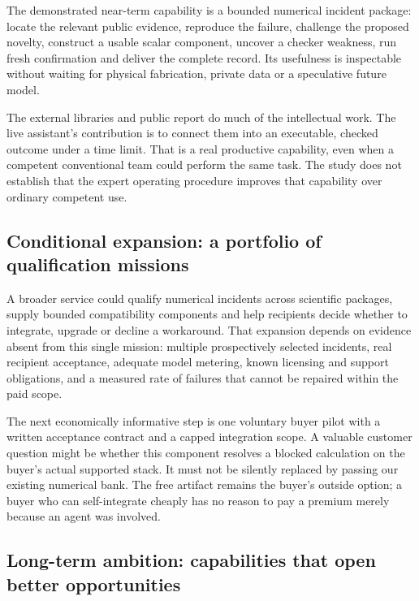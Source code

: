 \documentclass[
  10pt,
]{article}
\begin{document}
The demonstrated near-term capability is a bounded numerical incident
package: locate the relevant public evidence, reproduce the failure,
challenge the proposed novelty, construct a usable scalar component,
uncover a checker weakness, run fresh confirmation and deliver the
complete record. Its usefulness is inspectable without waiting for
physical fabrication, private data or a speculative future model.

The external libraries and public report do much of the intellectual
work. The live assistant's contribution is to connect them into an
executable, checked outcome under a time limit. That is a real
productive capability, even when a competent conventional team could
perform the same task. The study does not establish that the expert
operating procedure improves that capability over ordinary competent
use.

\hypertarget{conditional-expansion-a-portfolio-of-qualification-missions}{%
\subsection{Conditional expansion: a portfolio of qualification
missions}\label{conditional-expansion-a-portfolio-of-qualification-missions}}

A broader service could qualify numerical incidents across scientific
packages, supply bounded compatibility components and help recipients
decide whether to integrate, upgrade or decline a workaround. That
expansion depends on evidence absent from this single mission: multiple
prospectively selected incidents, real recipient acceptance, adequate
model metering, known licensing and support obligations, and a measured
rate of failures that cannot be repaired within the paid scope.

The next economically informative step is one voluntary buyer pilot with
a written acceptance contract and a capped integration scope. A valuable
customer question might be whether this component resolves a blocked
calculation on the buyer's actual supported stack. It must not be
silently replaced by passing our existing numerical bank. The free
artifact remains the buyer's outside option; a buyer who can
self-integrate cheaply has no reason to pay a premium merely because an
agent was involved.

\hypertarget{long-term-ambition-capabilities-that-open-better-opportunities}{%
\subsection{Long-term ambition: capabilities that open better
opportunities}\label{long-term-ambition-capabilities-that-open-better-opportunities}}
\end{document}
